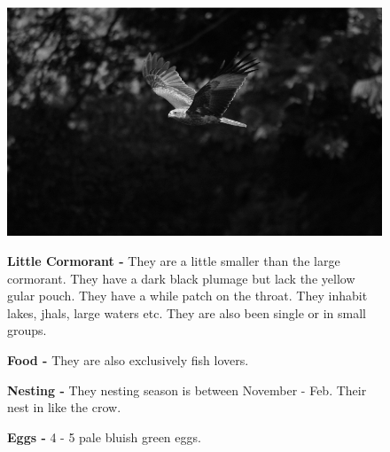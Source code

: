 \begin{figure}[H]
\begin{center}
\includegraphics{figure/Land_birds/01_pariah_kite/pariah-kite.eps}
\end{center}
\medskip
\noindent
{\bf Little Cormorant -} They are a little smaller than the large cormorant. They have a dark black plumage but lack the yellow gular pouch. They have a while patch on the throat. They inhabit lakes, jhals, large waters etc. They are also been single or in small groups. 

\medskip
{\bf Food -} They are also exclusively fish lovers.

{\bf Nesting -} They nesting season is between November - Feb. Their nest in like the crow. 

{\bf Eggs -} 4 - 5 pale bluish green eggs.
\end{figure}

\vfill\eject

~\phantom{a}
\vfill


